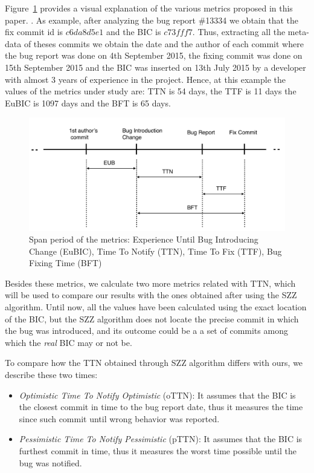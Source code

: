 \documentclass[10pt, conference]{IEEEtran}
\begin{document}
Figure~\ref{fig:metrics} provides a visual explanation of the various metrics proposed in this paper. . As example, after analyzing the bug report \#13334 we obtain that the fix commit id is $c6da8d5e1$ and the BIC is $c73fff7$. Thus, extracting all the meta-data of theses commits we obtain the date and the author of each commit where the bug report was done on 4th September 2015, the fixing commit was done on 15th September 2015 and the BIC was inserted on 13th July 2015 by a developer with almost 3 years of experience in the project. Hence, at this example the values of the metrics under study are:  TTN is 54 days, the TTF is 11 days the EuBIC is 1097 days and the BFT is 65 days.
\begin{figure}[ht]
\centering
\includegraphics[width=\columnwidth]{metrics.png}
\caption{ Span period of the metrics: Experience Until Bug Introducing Change (EuBIC),  Time To Notify (TTN), Time To Fix (TTF), Bug Fixing Time (BFT) }
\label{fig:metrics}       %
\end{figure}

Besides these metrics, we calculate two more metrics related with TTN, which will be used to compare our results with the ones obtained after using the SZZ algorithm. Until now, all the values have been calculated using the exact location of the BIC, but the SZZ algorithm does not locate the precise commit in which the bug was introduced, and its outcome could be a a set of commits among which the \emph{real} BIC may or not be. 

To compare how the TTN obtained through SZZ algorithm differs with ours, we describe these two times:
\begin{itemize}
	\item \emph{Optimistic Time To Notify Optimistic} (oTTN): It assumes that the BIC is the closest commit in time to the bug report date, thus it measures the time since such commit until wrong behavior was reported.
	\item \emph{Pessimistic Time To Notify Pessimistic} (pTTN): It assumes that the BIC is furthest commit in time, thus it measures the worst time possible until the bug was notified.
\end{itemize}
\end{document}
